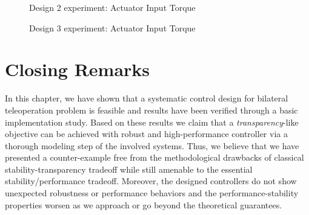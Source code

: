 \begin{figure}%
\centering
{}
\caption{Design 2 experiment: Actuator Input Torque}%
\label{fig:app:design2actoverall}%
\end{figure}

\begin{figure}%
\centering
{}
\caption{Design 3 experiment: Actuator Input Torque}%
\label{fig:app:design3actoverall}%
\end{figure}

\clearpage

\section{Closing Remarks}

In this chapter, we have shown that a systematic control design for bilateral teleoperation problem is feasible and results have been 
verified through a basic implementation study. Based on these results we claim that a \emph{transparency}-like objective can be achieved with 
robust and high-performance controller via a thorough modeling step of the involved systems. Thus, we believe that we have presented a 
counter-example free from the methodological drawbacks of classical stability-transparency tradeoff while still amenable to the essential
stability/performance tradeoff. Moreover, the designed controllers do not show unexpected robustness or performance behaviors and the 
performance-stability properties worsen as we approach or go beyond the theoretical guarantees. 

